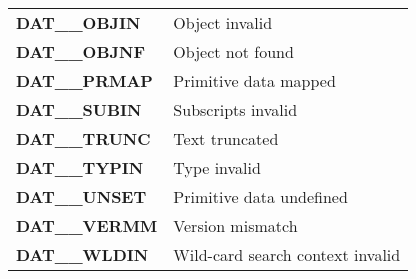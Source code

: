 \begin{center}
\begin{tabular}{|l|l|}
{\bf DAT\_\_OBJIN} & Object invalid\\
{\bf DAT\_\_OBJNF} & Object not found\\
{\bf DAT\_\_PRMAP} & Primitive data mapped\\
{\bf DAT\_\_SUBIN} & Subscripts invalid\\
{\bf DAT\_\_TRUNC} & Text truncated\\
{\bf DAT\_\_TYPIN} & Type invalid\\
{\bf DAT\_\_UNSET} & Primitive data undefined\\
{\bf DAT\_\_VERMM} & Version mismatch\\
{\bf DAT\_\_WLDIN} & Wild-card search context invalid \\
\hline
\end{tabular}
\end{center}
\normalsize

